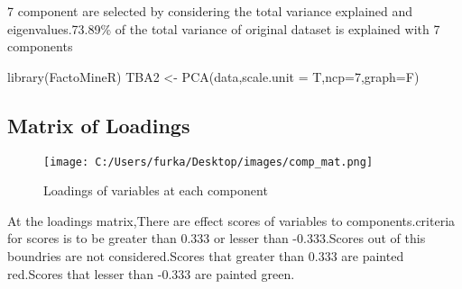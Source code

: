 \documentclass[12pt,twoside]{deuthesis}
\newenvironment{Shaded}{\begin{snugshade}}{\end{snugshade}}
\newcommand{\AttributeTok}[1]{\textcolor[rgb]{0.77,0.63,0.00}{#1}}
\newcommand{\DecValTok}[1]{\textcolor[rgb]{0.00,0.00,0.81}{#1}}
\newcommand{\FunctionTok}[1]{\textcolor[rgb]{0.00,0.00,0.00}{#1}}
\newcommand{\NormalTok}[1]{#1}
\newcommand{\OtherTok}[1]{\textcolor[rgb]{0.56,0.35,0.01}{#1}}
\begin{document}
7 component are selected by considering the total variance explained and eigenvalues.73.89\% of the total variance of original dataset is explained with 7 components
\begin{Shaded}
\begin{Highlighting}[]
\FunctionTok{library}\NormalTok{(FactoMineR)}
\NormalTok{TBA2 }\OtherTok{\textless{}{-}} \FunctionTok{PCA}\NormalTok{(data,}\AttributeTok{scale.unit =}\NormalTok{ T,}\AttributeTok{ncp=}\DecValTok{7}\NormalTok{,}\AttributeTok{graph=}\NormalTok{F)}
\end{Highlighting}
\end{Shaded}
\hypertarget{matrix-of-loadings}{%
\subsection{Matrix of Loadings}\label{matrix-of-loadings}}
\begin{figure}
\centering
\texttt{[image: C:/Users/furka/Desktop/images/comp\_mat.png]}
\caption{Loadings of variables at each component}
\end{figure}
At the loadings matrix,There are effect scores of variables to components.criteria for scores is to be greater than 0.333 or lesser than -0.333.Scores out of this boundries are not considered.Scores that greater than 0.333 are painted red.Scores that lesser than -0.333 are painted green.
\end{document}
